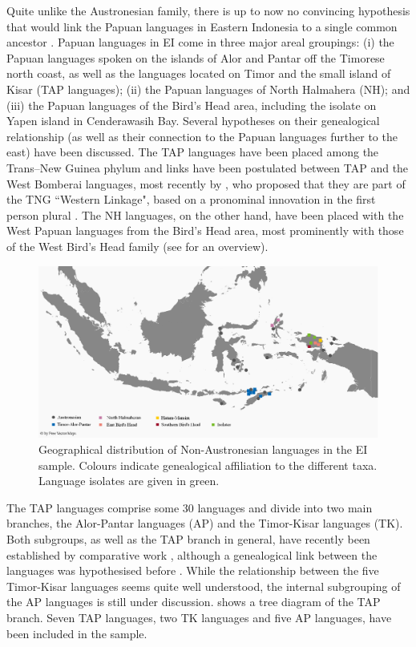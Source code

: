 Quite unlike the Austronesian family, there is up to now no convincing hypothesis that would link the Papuan languages in Eastern Indonesia to a single common ancestor \citep{reesink2005west, klamer2008east}. Papuan languages in EI come in three major areal groupings: (i) the Papuan languages spoken on the islands of Alor and Pantar off the Timorese north coast, as well as the languages located on Timor and the small island of Kisar (\textsc{TAP} languages); (ii) the Papuan languages of North Halmahera (NH); and (iii) the Papuan languages of the Bird's Head area, including the isolate  on Yapen island in Cenderawasih Bay. Several hypotheses on their genealogical relationship (as well as their connection to the Papuan languages further to the east) have been discussed. The TAP languages have been placed among the Trans--New Guinea phylum and links have been postulated between TAP and the West Bomberai languages, most recently by \citet{Ross2005}, who proposed that they are part of the TNG ``Western Linkage", based on a pronominal innovation in the first person plural \citep[9]{schapper2014intro}. The NH languages, on the other hand, have been placed with the West Papuan languages from the Bird's Head area, most prominently with those of the West Bird's Head family (see \citealt{reesink2005west} for an overview).

\begin{figure}
\includegraphics[width=\columnwidth]{figures/Map_overview_klein_Papuaff.eps}
\caption[Geographical distribution of Non-Austronesian languages in the sample]{Geographical distribution of Non-Austronesian languages in the EI sample. Colours indicate genealogical affiliation to the different taxa. Language isolates are given in green.}\label{map:Austro2}
\end{figure}

The TAP languages comprise some 30 languages and divide into two main branches, the Alor-Pantar languages (\textsc{AP}) and the Timor-Kisar languages (\textsc{TK}). Both subgroups, as well as the TAP branch in general, have recently been established by comparative work \citep{holton2012historical, klamer2014alor}, although a genealogical link between the languages was hypothesised before \citep[7]{schapper2014intro}. While the relationship between the five Timor-Kisar languages seems quite well understood, the internal subgrouping of the AP languages is still under discussion.  shows a tree diagram of the TAP branch. Seven TAP languages, two TK languages and five AP languages, have been included in the sample.

